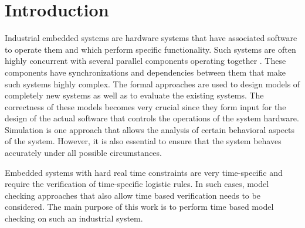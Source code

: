 \documentclass[letterpaper]{article}
\begin{document}
\section{Introduction}
Industrial embedded systems are hardware systems that have associated software to operate them and which perform specific functionality. Such systems are often highly concurrent with several parallel components operating together \cite{AS11}. These components have synchronizations and dependencies between them that make such systems highly complex. The formal approaches are used to design models of completely new systems as well as to evaluate the existing systems. The correctness of these models becomes very crucial since they form input for the design of the actual software that controls the operations of the system hardware. Simulation is one approach that allows the analysis of certain behavioral aspects of the system. However, it is also essential to ensure that the system behaves accurately under all possible circumstances. 
\par Embedded systems with hard real time constraints are very time-specific and require the verification of time-specific logistic rules. In such cases, model checking approaches that also allow time based verification needs to be considered. The main purpose of this work is to perform time based model checking on such an industrial system. 
	
\end{document}
